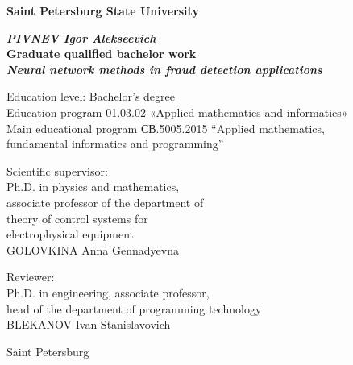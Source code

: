 \begin{titlepage}
\begin{center}

\textbf{Saint Petersburg State University}

\vspace{34mm}

\textbf{\textit{\large PIVNEV Igor Alekseevich}} \\[8mm]
\textbf{\large Graduate qualified bachelor work} \\[3mm]
\textbf{\textit{\large Neural network methods in fraud detection applications}}

\vspace{15mm}

Education level: Bachelor's degree \\
Education program 01.03.02 «Applied mathematics and informatics» \\
Main educational program СВ.5005.2015 “Applied mathematics, \\
fundamental informatics and programming”

\vspace{20mm}
\begin{flushright}
\begin{minipage}[t]{0.65\textwidth}

{Scientific supervisor:} \\
Ph.D. in physics and mathematics, \\
associate professor of the department of \\
theory of control systems for \\
electrophysical equipment \\
GOLOVKINA Anna Gennadyevna

\vspace{10mm}

{Reviewer:} \\
Ph.D. in engineering, associate professor, \\
head of the department of programming technology \\
BLEKANOV Ivan Stanislavovich

\end{minipage}
\end{flushright}
\vfill

{Saint Petersburg}
\par{\the\year{}}

\end{center}
\end{titlepage}
\restoregeometry
\addtocounter{page}{2}
